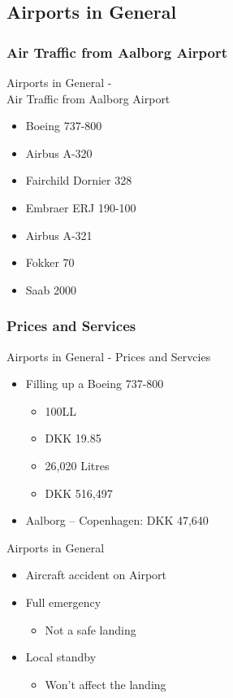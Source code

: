 \subsection{Airports in General}

\subsubsection{Air Traffic from Aalborg Airport}
\begin{frame}{Airports in General - \\Air Traffic from Aalborg Airport}{}
	\begin{itemize}
		\item Boeing 737-800 
		\item Airbus A-320 
		\item Fairchild Dornier 328 
		\item Embraer ERJ 190-100 
		\item Airbus A-321 
		\item Fokker 70 
		\item Saab 2000 
	\end{itemize}
\end{frame}

\subsubsection{Prices and Services}
\begin{frame}{Airports in General - Prices and Servcies}{}
	\begin{itemize}
		\item Filling up a Boeing 737-800
			\begin{itemize}
				\item 100LL
				\item DKK 19.85
				\item 26,020 Litres
				\item DKK 516,497
			\end{itemize}
		\item Aalborg – Copenhagen: DKK 47,640
	\end{itemize}
\end{frame}

\begin{frame}{Airports in General}{}
	\begin{itemize}
		\item Aircraft accident on Airport
		\item Full emergency
			\begin{itemize}
				\item Not a safe landing
			\end{itemize}
		\item Local standby
			\begin{itemize}
				\item Won't affect the landing
			\end{itemize}
	\end{itemize}
\end{frame}